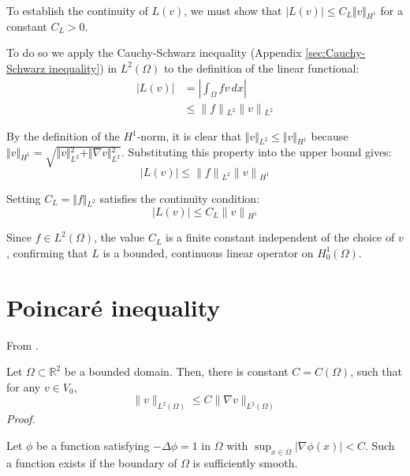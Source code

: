 \documentclass[acmsmall,screen]{MapleTrans}
\begin{document}
To establish the continuity of $L(v)$, we must show that $\vert{}L(v)\vert{} \le C_L \Vert{}v\Vert{}_{H^1}$ for a constant $C_L > 0$. 

To do so we apply the Cauchy-Schwarz inequality (Appendix \ref{sec:Cauchy-Schwarz inequality}) in $L^2(\Omega)$ to the definition of the linear functional:
\begin{equation}
\begin{aligned}
    |L(v)| &= \left|\int _{\Omega }fv\,dx\right| \\
    &\le \|f\|{}_{L^{2}}\|v\|{}_{L^{2}}
\end{aligned}
\end{equation}

By the definition of the $H^{1}$-norm, it is clear that $\Vert{}v\Vert{}_{L^2} \le \Vert{}v\Vert{}_{H^1}$ because $\Vert{}v\Vert{}_{H^1} = \sqrt{\Vert{}v\Vert{}_{L^2}^2 + \Vert{}\nabla v\Vert{}_{L^2}^2}$. Substituting this property into the upper bound gives:
\begin{equation}
    |L(v)| \le \|f\|{}_{L^{2}}\|v\|{}_{H^{1}}
\end{equation}

Setting \(C_L = \Vert{}f\Vert{}_{L^2}\) satisfies the continuity condition:
\begin{equation}
    |L(v)|\le C_{L}\|v\|{}_{H^{1}}
\end{equation}

Since $f \in L^2(\Omega)$, the value $C_{L}$ is a finite constant independent of the choice of $v$, confirming that $L$ is a bounded, continuous linear operator on $H^1_0(\Omega)$.


\section{Poincaré inequality} \label{sec:Poincaré inequality}
From \cite{b10}. 

Let $\Omega \subset \mathbb{R}^2$ be a bounded domain. Then, there is constant $C = C(\Omega)$, such that for any $v \in V_0$,
\begin{equation}
    \|v\|_{L^2(\Omega)} \leq C\|\nabla v\|_{L^2(\Omega)}
\end{equation}
\textit{Proof.}

Let $\phi$ be a function satisfying $-\Delta\phi = 1$ in $\Omega$ with $\sup_{x\in \Omega}\Big|\nabla \phi(x)\Big| < C$. Such a function exists if the boundary of $\Omega$ is sufficiently smooth.
\end{document}
